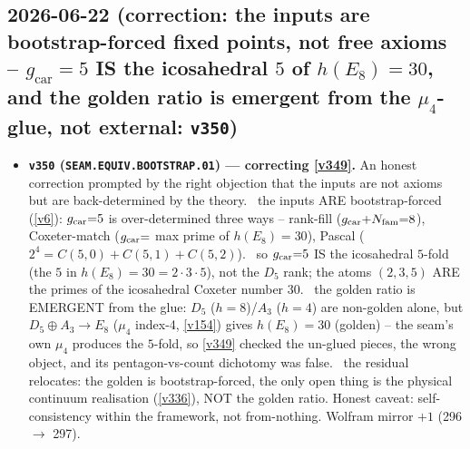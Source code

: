 \subsection*{2026-06-22 (correction: the inputs are bootstrap-forced fixed points, not free axioms -- $g_{\mathrm{car}}{=}5$ IS the icosahedral $5$ of $h(E_8){=}30$, and the golden ratio is emergent from the $\mu_4$-glue, not external: \texttt{v350})}
\begin{itemize}
\item \textbf{\texttt{v350} (\texttt{SEAM.EQUIV.BOOTSTRAP.01}) --- correcting \vref{v349}.} An honest correction
prompted by the right objection that the inputs are not axioms but are back-determined by the theory. \mE\ the
inputs ARE bootstrap-forced (\vref{v6}): $g_{\mathrm{car}}{=}5$ is over-determined three ways -- rank-fill ($g_{\mathrm{car}}{+}N_{\mathrm{fam}}{=}8$),
Coxeter-match ($g_{\mathrm{car}}{=}$ max prime of $h(E_8){=}30$), Pascal ($2^4{=}C(5,0){+}C(5,1){+}C(5,2)$). \mE\ so
$g_{\mathrm{car}}{=}5$ IS the icosahedral $5$-fold (the $5$ in $h(E_8){=}30{=}2{\cdot}3{\cdot}5$), not the $D_5$ rank; the atoms
$(2,3,5)$ ARE the primes of the icosahedral Coxeter number $30$. \mE\ the golden ratio is EMERGENT from the glue:
$D_5$ ($h{=}8$)/$A_3$ ($h{=}4$) are non-golden alone, but $D_5\!\oplus\!A_3\to E_8$ ($\mu_4$ index-4, \vref{v154})
gives $h(E_8){=}30$ (golden) -- the seam's own $\mu_4$ produces the $5$-fold, so \vref{v349} checked the un-glued
pieces, the wrong object, and its pentagon-vs-count dichotomy was false. \mO\ the residual relocates: the golden is
bootstrap-forced, the only open thing is the physical continuum realisation (\vref{v336}), NOT the golden ratio.
Honest caveat: self-consistency within the framework, not from-nothing. Wolfram mirror $+1$ (296 $\to$ 297).
\end{itemize}

